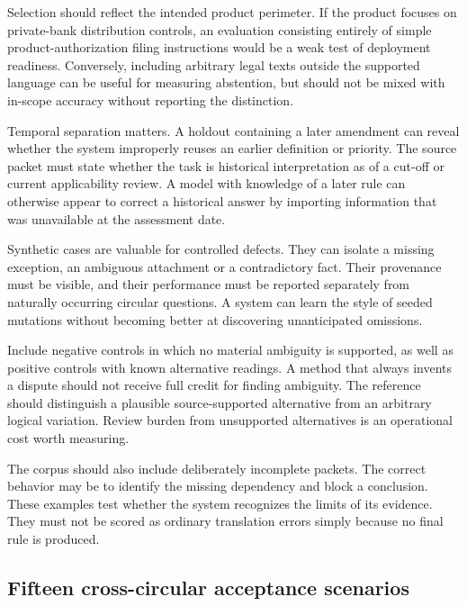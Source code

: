 Selection should reflect the intended product perimeter. If the product focuses
on private-bank distribution controls, an evaluation consisting entirely of simple
product-authorization filing instructions would be a weak test of deployment
readiness. Conversely, including arbitrary legal texts outside the supported
language can be useful for measuring abstention, but should not be mixed with
in-scope accuracy without reporting the distinction.

Temporal separation matters. A holdout containing a later amendment can reveal
whether the system improperly reuses an earlier definition or priority. The
source packet must state whether the task is historical interpretation as of a
cut-off or current applicability review. A model with knowledge of a later rule
can otherwise appear to correct a historical answer by importing information
that was unavailable at the assessment date.


Synthetic cases are valuable for controlled defects. They can isolate a missing
exception, an ambiguous attachment or a contradictory fact. Their provenance must
be visible, and their performance must be reported separately from naturally
occurring circular questions. A system can learn the style of seeded mutations
without becoming better at discovering unanticipated omissions.

Include negative controls in which no material ambiguity is supported, as well
as positive controls with known alternative readings. A method that always
invents a dispute should not receive full credit for finding ambiguity. The
reference should distinguish a plausible source-supported alternative from an
arbitrary logical variation. Review burden from unsupported alternatives is an
operational cost worth measuring.

The corpus should also include deliberately incomplete packets. The correct
behavior may be to identify the missing dependency and block a conclusion. These
examples test whether the system recognizes the limits of its evidence. They
must not be scored as ordinary translation errors simply because no final rule
is produced.

\subsection{Fifteen cross-circular acceptance scenarios}
\label{merge:P-05-evidence:00}


